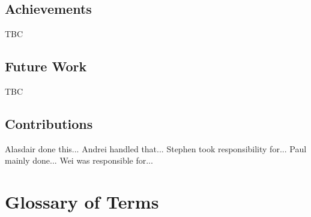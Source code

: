 \documentclass{l3proj}
\begin{document}
\section{Achievements}
TBC

\section{Future Work}
TBC

\section{Contributions}

Alasdair done this...
Andrei handled that...
Stephen took responsibility for... 
Paul mainly done...
Wei was responsible for...	





\appendix
\chapter{Glossary of Terms}
\label{sec:gloss}
\end{document}
